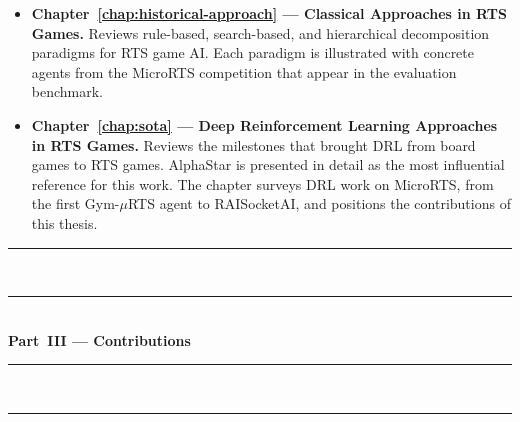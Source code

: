 \begin{itemize}

    \item \textbf{Chapter~\ref{chap:historical-approach} --- Classical Approaches in RTS Games.} Reviews rule-based, search-based, and hierarchical decomposition paradigms for RTS game AI. Each paradigm is illustrated with concrete agents from the MicroRTS competition that appear in the evaluation benchmark.

    \item \textbf{Chapter~\ref{chap:sota} --- Deep Reinforcement Learning Approaches in RTS Games.} Reviews the milestones that brought DRL from board games to RTS games. AlphaStar is presented in detail as the most influential reference for this work. The chapter surveys DRL work on MicroRTS, from the first Gym-$\mu$RTS agent to RAISocketAI, and positions the contributions of this thesis.

\end{itemize}

\rule{\linewidth}{0.4pt}\\[-1.0em]
        \rule{\linewidth}{0.4pt}\\[+0.0em]
        \textbf{Part~III --- Contributions}\\[-0.5em]
        \rule{\linewidth}{0.4pt}\\[-1.0em]
        \rule{\linewidth}{0.4pt}
        

